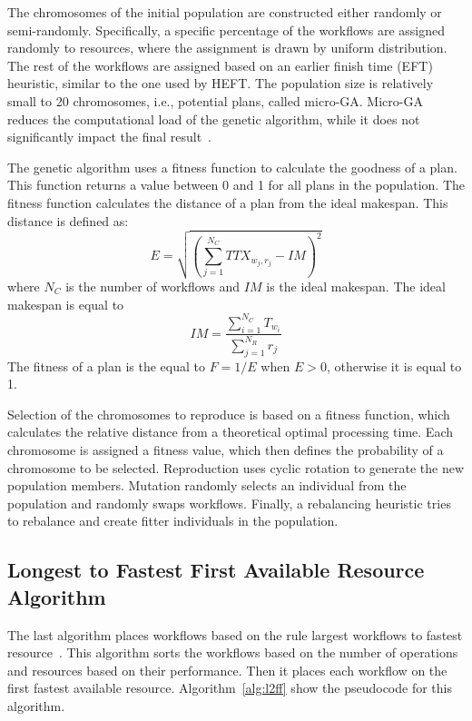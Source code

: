 The chromosomes of the initial population are constructed either randomly or semi-randomly.
Specifically, a specific percentage of the workflows are assigned randomly to resources, where the assignment is drawn by uniform distribution.
The rest of the workflows are assigned based on an earlier finish time (EFT) heuristic, similar to the one used by HEFT.
The population size is relatively small to 20 chromosomes, i.e., potential plans, called micro-GA.
Micro-GA reduces the computational load of the genetic algorithm, while it does not significantly impact the final result~\cite{zomaya2001observations}.

The genetic algorithm uses a fitness function to calculate the goodness of a plan.
This function returns a value between 0 and 1 for all plans in the population.
The fitness function calculates the distance of a plan from the ideal makespan.
This distance is defined as:
\begin{equation}
E = \sqrt{(\sum_{j=1}^{N_{C}}TTX_{w_{j},r_{j}} - IM)^2}
\label{eq:fitness}
\end{equation}
where $N_{C}$ is the number of workflows and $IM$ is the ideal makespan.
The ideal makespan is equal to
\begin{equation}
IM = \frac{\sum_{i=1}^{N_{C}}T_{w_{i}}}{\sum_{j=1}^{N_{R}}r_{j}}
\label{eq:ideal_fitness}
\end{equation}
The fitness of a plan is the equal to $F = 1 /E$ when $E > 0$, otherwise it is equal to 1.

Selection of the chromosomes to reproduce is based on a fitness function, which calculates the relative distance from a theoretical optimal processing time.
Each chromosome is assigned a fitness value, which then defines the probability of a chromosome to be selected.
Reproduction uses cyclic rotation to generate the new population members.
Mutation randomly selects an individual from the population and randomly swaps workflows.
Finally, a rebalancing heuristic tries to rebalance and create fitter individuals in the population.

\subsection{Longest to Fastest First Available Resource Algorithm}
\label{algo:l2ff}
The last algorithm places workflows based on the rule largest workflows to fastest resource~\cite{balasubramanian2019programming}.
This algorithm sorts the workflows based on the number of operations and resources based on their performance.
Then it places each workflow on the first fastest available resource.
Algorithm~\ref{alg:l2ff} show the pseudocode for this algorithm.

